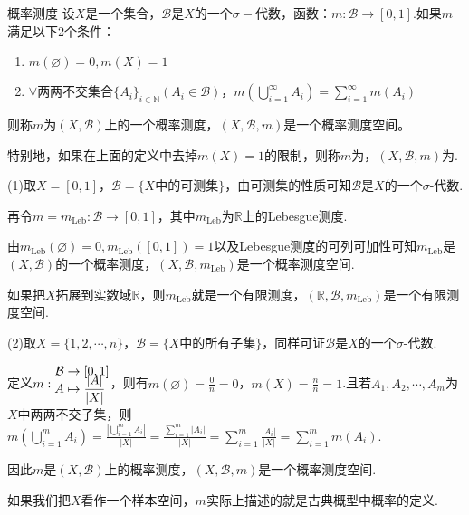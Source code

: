 \begin{definition}{概率测度}
    \wideline
    设$X$是一个集合，$\mathcal{B}$是$X$的一个$\sigma-\text{代数}$，函数：$m:\mathcal{B}\rightarrow[0,1]$.如果$m$满足以下2个条件：

    \begin{enumerate}
        \item $m(\varnothing)=0,m(X)=1$
        \item $\forall$两两不交集合$\{A_i\}_{i\in\mathbb{N}}(A_i\in\mathcal{B})$，$m\left(\bigcup_{i=1}^{\infty}{A_i}\right)=\sum_{i=1}^{\infty}{m(A_i)}$
    \end{enumerate}
    则称$m$为$(X,\mathcal{B})$上的一个概率测度，$(X,\mathcal{B},m)$是一个概率测度空间。
\end{definition}
特别地，如果在上面的定义中去掉$m(X)=1$的限制，则称$m$为，$(X,\mathcal{B},m)$为.

\begin{instance}
    (1)取$X=[0,1]$，$\mathcal{B}=\{X\text{中的可测集}\}$，由可测集的性质可知$\mathcal{B}$是$X$的一个$\sigma$-代数.\par

    再令$m=m_{\mathrm{Leb}}:\mathcal{B}\rightarrow [0,1]$，其中$m_{\mathrm{Leb}}$为$\mathbb{R}$上的Lebesgue测度.\par
    由$m_{\mathrm{Leb}}(\varnothing)=0,m_{\mathrm{Leb}}([0,1])=1$以及Lebesgue测度的可列可加性可知$m_{\mathrm{Leb}}$是$(X,\mathcal{B})$的一个概率测度，$(X,\mathcal{B},m_{\mathrm{Leb}})$是一个概率测度空间.\par
    如果把$X$拓展到实数域$\mathbb{R}$，则$m_{\mathrm{Leb}}$就是一个有限测度，$(\mathbb{R},\mathcal{B},m_{\mathrm{Leb}})$是一个有限测度空间.\par
    (2)取$X=\{1,2,\cdots,n\}$，$\mathcal{B}=\{X\text{中的所有子集}\}$，同样可证$\mathcal{B}$是$X$的一个$\sigma$-代数.\par
    定义$m:{\setlength{\jot}{-0.5em}\begin{aligned}
        \mathcal{B}&\to [0,1]\\
        A&\mapsto \frac{|A|}{|X|}
    \end{aligned}}$，则有$m(\varnothing)=\frac{0}{n}=0$，$m(X)=\frac{n}{n}=1$.且若$A_1,A_2,\cdots,A_m$为$X$中两两不交子集，则$m\left(\bigcup_{i=1}^m{A_i}\right)=\frac{\left|\displaystyle\bigcup_{i=1}^m{A_i}\right|}{|X|}=\frac{\displaystyle\sum_{i=1}^m{|A_i|}}{|X|}=\sum_{i=1}^m{\frac{|A_i|}{|X|}}=\sum_{i=1}^m{m(A_i)}$.\par
    因此$m$是$(X,\mathcal{B})$上的概率测度，$(X,\mathcal{B},m)$是一个概率测度空间.\par
    如果我们把$X$看作一个样本空间，$m$实际上描述的就是古典概型中概率的定义.
\end{instance}

